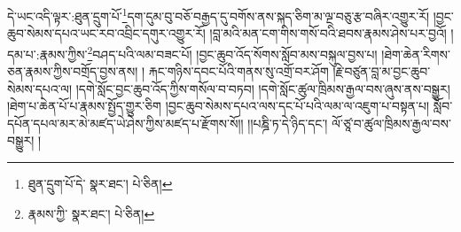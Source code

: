 དེ་ཡང་འདི་ལྟར་:ཐུན་དྲུག་པོ་\footnote{ཐུན་དྲུག་པོ་དེ་  སྣར་ཐང་།  པེ་ཅིན། }དག་དུམ་བུ་བཅོ་བརྒྱད་དུ་བགོས་ནས་སྐད་ཅིག་མ་ལྔ་བཅུ་རྩ་བཞིར་འགྱུར་རོ། །བྱང་ཆུབ་སེམས་དཔའ་ཡང་རབ་འབྲིང་དགུར་འགྱུར་རོ། །བླ་མའི་མན་ངག་གིས་གསོ་བའི་ཐབས་རྣམས་ཤེས་པར་བྱའོ། །དམ་པ་:རྣམས་ཀྱིས་\footnote{རྣམས་ཀྱི་  སྣར་ཐང་།  པེ་ཅིན། }བཤད་པའི་ལམ་བཟང་པོ། །བྱང་ཆུབ་འོད་སོགས་སློབ་མས་བསྐུལ་བྱས་པ། །ཐེག་ཆེན་རིགས་ཅན་རྣམས་ཀྱིས་བགྲོད་བྱས་ནས། །
རྐང་གཉིས་དབང་པོའི་གནས་སུ་འགྲོ་བར་ཤོག །རྗེ་བཙུན་བླ་མ་བྱང་ཆུབ་སེམས་དཔའ་ལ། །དགེ་སློང་བྱང་ཆུབ་འོད་ཀྱིས་གསོལ་བ་བཏབ། །དགེ་སློང་ཚུལ་ཁྲིམས་རྒྱལ་བས་ཞུས་ནས་བསྒྱུར། །ཐེག་པ་ཆེན་པོ་པ་རྣམས་སྤྱོད་གྱུར་ཅིག །བྱང་ཆུབ་སེམས་དཔའ་ལས་དང་པོ་པའི་ལམ་ལ་འཇུག་པ་བསྟན་པ། སློབ་དཔོན་དཔལ་མར་མེ་མཛད་ཡེ་ཤེས་ཀྱིས་མཛད་པ་རྫོགས་སོ།། །།པཎྜི་ཏ་དེ་ཉིད་དང་། ལོ་ཙཱ་བ་ཚུལ་ཁྲིམས་རྒྱལ་བས་བསྒྱུར། ། 